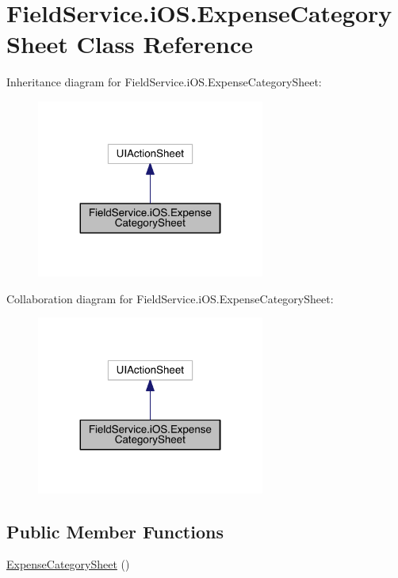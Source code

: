 \hypertarget{class_field_service_1_1i_o_s_1_1_expense_category_sheet}{\section{Field\+Service.\+i\+O\+S.\+Expense\+Category\+Sheet Class Reference}
\label{class_field_service_1_1i_o_s_1_1_expense_category_sheet}
}


Inheritance diagram for Field\+Service.\+i\+O\+S.\+Expense\+Category\+Sheet\+:
\nopagebreak
\begin{figure}[H]
\begin{center}
\leavevmode
\includegraphics[width=212pt]{class_field_service_1_1i_o_s_1_1_expense_category_sheet__inherit__graph}
\end{center}
\end{figure}


Collaboration diagram for Field\+Service.\+i\+O\+S.\+Expense\+Category\+Sheet\+:
\nopagebreak
\begin{figure}[H]
\begin{center}
\leavevmode
\includegraphics[width=212pt]{class_field_service_1_1i_o_s_1_1_expense_category_sheet__coll__graph}
\end{center}
\end{figure}
\subsection*{Public Member Functions}
\begin{DoxyCompactItemize}
\item 
\hyperlink{class_field_service_1_1i_o_s_1_1_expense_category_sheet_a76a162888a9647f667a950cd2c250feb}{Expense\+Category\+Sheet} ()
\end{DoxyCompactItemize}
